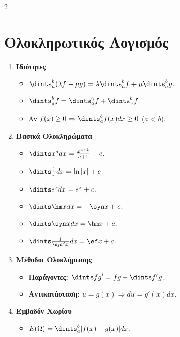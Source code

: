 \documentclass[a4paper,11pt,twoside]{article}
\begin{document}
\begin{multicols}{2}
\section{Ολοκληρωτικός Λογισμός}
\begin{enumerate}
    \item \textbf{Ιδιότητες}
    \begin{itemize}[leftmargin=0mm]
        \item $\dints_a^b (\lambda f + \mu g) = \lambda \dints_a^b f + \mu \dints_a^b g$.
        \item $\dints_a^b f = \dints_a^\gamma f + \dints_\gamma^b f$.
        \item Αν $f(x) \ge 0 \Rightarrow \dints_a^b f(x)dx \ge 0$ ($a<b$).
    \end{itemize}

    \item \textbf{Βασικά Ολοκληρώματα}
    \begin{itemize}[leftmargin=0mm]
        \item $\dints x^a dx = \frac{x^{a+1}}{a+1} + c$.
        \item $\dints \frac{1}{x} dx = \ln|x| + c$.
        \item $\dints e^x dx = e^x + c$.
        \item $\dints \hm x dx = -\syn x + c$.
        \item $\dints \syn x dx = \hm x + c$.
        \item $\dints \frac{1}{\syn^2 x} dx = \ef x + c$.
    \end{itemize}

    \item \textbf{Μέθοδοι Ολοκλήρωσης}
    \begin{itemize}[leftmargin=0mm]
        \item \textbf{Παράγοντες:} $\dints f g' = fg - \dints f' g$.
        \item \textbf{Αντικατάσταση:} $u=g(x) \Rightarrow du=g'(x)dx$.
    \end{itemize}

    \item \textbf{Εμβαδόν Χωρίου}
    \begin{itemize}[leftmargin=0mm]
        \item $E(\Omega) = \dints_a^b |f(x) - g(x)| dx$.
    \end{itemize}
\end{enumerate}

\end{multicols}
\end{document}
